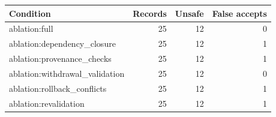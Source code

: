\begin{tabular}{lrrr}
Condition & Records & Unsafe & False accepts \\
\hline
ablation:full & 25 & 12 & 0 \\
ablation:dependency\_closure & 25 & 12 & 1 \\
ablation:provenance\_checks & 25 & 12 & 1 \\
ablation:withdrawal\_validation & 25 & 12 & 0 \\
ablation:rollback\_conflicts & 25 & 12 & 1 \\
ablation:revalidation & 25 & 12 & 1 \\
\end{tabular}
